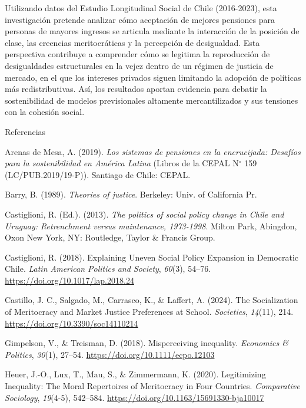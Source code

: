 \documentclass[
  12pt,
  letterpaper,
  DIV=11,
  numbers=noendperiod]{scrartcl}
\newlength{\cslhangindent}
\newenvironment{CSLReferences}[2] %
 {\begin{list}{}{%
  \setlength{\itemindent}{0pt}
  \setlength{\leftmargin}{0pt}
  \setlength{\parsep}{0pt}
  \ifodd #1
   \setlength{\leftmargin}{\cslhangindent}
   \setlength{\itemindent}{-1\cslhangindent}
  \fi
  \setlength{\itemsep}{#2\baselineskip}}}
 {\end{list}}
\begin{document}
Utilizando datos del Estudio Longitudinal Social de Chile (2016-2023),
esta investigación pretende analizar cómo aceptación de mejores
pensiones para personas de mayores ingresos se articula mediante la
interacción de la posición de clase, las creencias meritocráticas y la
percepción de desigualdad. Esta perspectiva contribuye a comprender cómo
se legitima la reproducción de desigualdades estructurales en la vejez
dentro de un régimen de justicia de mercado, en el que los intereses
privados siguen limitando la adopción de políticas más redistributivas.
Así, los resultados aportan evidencia para debatir la sostenibilidad de
modelos previsionales altamente mercantilizados y sus tensiones con la
cohesión social.

Referencias

\label{refs}
\begin{CSLReferences}{1}{0}
Arenas de Mesa, A. (2019). \emph{Los sistemas de pensiones en la
encrucijada: Desaf{í}os para la sostenibilidad en {Am{é}rica Latina}}
(Libros de la CEPAL N{\(^\circ\)} 159 (LC/PUB.2019/19-P)). Santiago de
Chile: CEPAL.

Barry, B. (1989). \emph{Theories of justice}. Berkeley: Univ. of
California Pr.

Castiglioni, R. (Ed.). (2013). \emph{The politics of social policy
change in {Chile} and {Uruguay}: Retrenchment versus maintenance,
1973-1998}. Milton Park, Abingdon, Oxon New York, NY: Routledge, Taylor
\& Francis Group.

Castiglioni, R. (2018). Explaining {Uneven Social Policy Expansion} in
{Democratic Chile}. \emph{Latin American Politics and Society},
\emph{60}(3), 54--76. \url{https://doi.org/10.1017/lap.2018.24}

Castillo, J. C., Salgado, M., Carrasco, K., \& Laffert, A. (2024). The
{Socialization} of {Meritocracy} and {Market Justice Preferences} at
{School}. \emph{Societies}, \emph{14}(11), 214.
\url{https://doi.org/10.3390/soc14110214}

Gimpelson, V., \& Treisman, D. (2018). Misperceiving inequality.
\emph{Economics \& Politics}, \emph{30}(1), 27--54.
\url{https://doi.org/10.1111/ecpo.12103}

Heuer, J.-O., Lux, T., Mau, S., \& Zimmermann, K. (2020). Legitimizing
{Inequality}: {The Moral Repertoires} of {Meritocracy} in {Four
Countries}. \emph{Comparative Sociology}, \emph{19}(4-5), 542--584.
\url{https://doi.org/10.1163/15691330-bja10017}


\end{CSLReferences}
\end{document}
